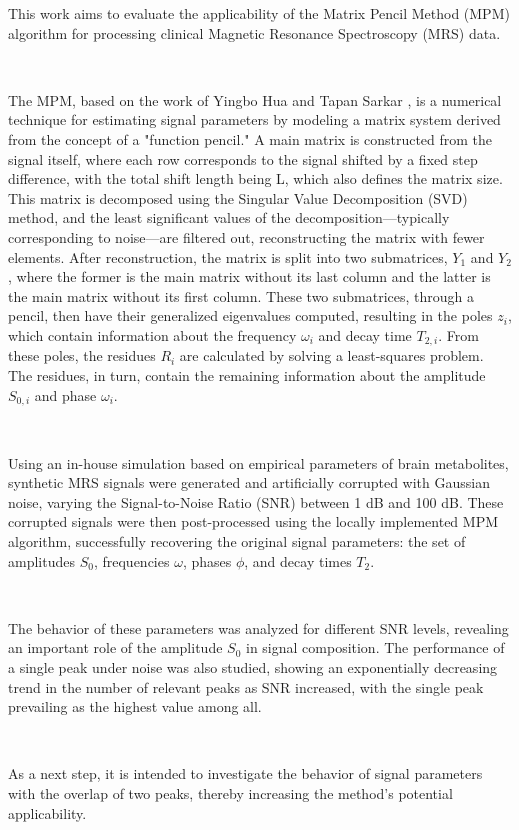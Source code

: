 \documentclass[10pt]{article}
\begin{document}
\vspace{12pt}
\begin{justify}
\quad This work aims to evaluate the applicability of the Matrix Pencil Method (MPM) algorithm for processing clinical Magnetic Resonance Spectroscopy (MRS) data.

\

The MPM, based on the work of Yingbo Hua and Tapan Sarkar \cite{370583}, is a numerical technique for estimating signal parameters by modeling a matrix system derived from 
the concept of a "function pencil." A main matrix is constructed from the signal itself, where each row corresponds to the signal shifted by a fixed step difference, 
with the total shift length being L, which also defines the matrix size. This matrix is decomposed using the Singular Value Decomposition (SVD) method, and the least 
significant values of the decomposition—typically corresponding to noise—are filtered out, reconstructing the matrix with fewer elements. After reconstruction, the 
matrix is split into two submatrices, $Y_1$ and $Y_2$, where the former is the main matrix without its last column and the latter is the main matrix without its first column. 
These two submatrices, through a pencil, then have their generalized eigenvalues computed, resulting in the poles $z_i$, which contain information about the frequency $\omega_i$ 
and decay time $T_{2,i}$. From these poles, the residues $R_i$ are calculated by solving a least-squares problem. The residues, in turn, contain the remaining information about 
the amplitude $S_{0,i}$ and phase $\omega_i$.

\

Using an in-house simulation based on empirical parameters of brain metabolites, synthetic MRS signals were generated and artificially corrupted with Gaussian noise, 
varying the Signal-to-Noise Ratio (SNR) between 1 dB and 100 dB. These corrupted signals were then post-processed using the locally implemented MPM algorithm, 
successfully recovering the original signal parameters: the set of amplitudes $S_0$, frequencies $\omega$, phases $\phi$, and decay times $T_2$.

\

The behavior of these parameters was analyzed for different SNR levels, revealing an important role of the amplitude $S_0$ in signal composition. The performance of a 
single peak under noise was also studied, showing an exponentially decreasing trend in the number of relevant peaks as SNR increased, with the single peak prevailing 
as the highest value among all.

\

As a next step, it is intended to investigate the behavior of signal parameters with the overlap of two peaks, thereby increasing the method's potential applicability.
\end{justify}

\vspace{24pt}

\begin{flushleft}




\vspace{6pt}

\vspace{12pt}

\end{flushleft}
\end{document}
